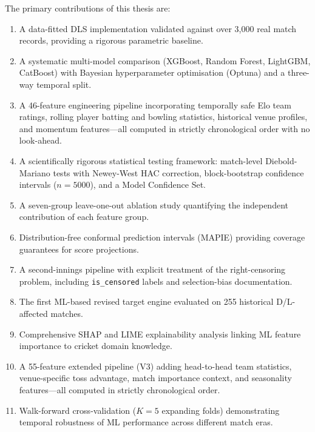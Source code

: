\documentclass[12pt,a4paper,oneside]{report}
\begin{document}
The primary contributions of this thesis are:

\begin{enumerate}
    \item A data-fitted DLS implementation validated against over 3,000 real match records, providing a rigorous parametric baseline.

    \item A systematic multi-model comparison (XGBoost, Random Forest, LightGBM, CatBoost) with Bayesian hyperparameter optimisation (Optuna) and a three-way temporal split.

    \item A 46-feature engineering pipeline incorporating temporally safe Elo team ratings, rolling player batting and bowling statistics, historical venue profiles, and momentum features---all computed in strictly chronological order with no look-ahead.

    \item A scientifically rigorous statistical testing framework: match-level Diebold-Mariano tests with Newey-West HAC correction, block-bootstrap confidence intervals ($n=5000$), and a Model Confidence Set.

    \item A seven-group leave-one-out ablation study quantifying the independent contribution of each feature group.

    \item Distribution-free conformal prediction intervals (MAPIE) providing coverage guarantees for score projections.

    \item A second-innings pipeline with explicit treatment of the right-censoring problem, including \texttt{is\_censored} labels and selection-bias documentation.

    \item The first ML-based revised target engine evaluated on 255 historical D/L-affected matches.

    \item Comprehensive SHAP and LIME explainability analysis linking ML feature importance to cricket domain knowledge.

    \item A 55-feature extended pipeline (V3) adding head-to-head team statistics, venue-specific toss advantage, match importance context, and seasonality features---all computed in strictly chronological order.

    \item Walk-forward cross-validation ($K=5$ expanding folds) demonstrating temporal robustness of ML performance across different match eras.


\end{enumerate}
\end{document}
